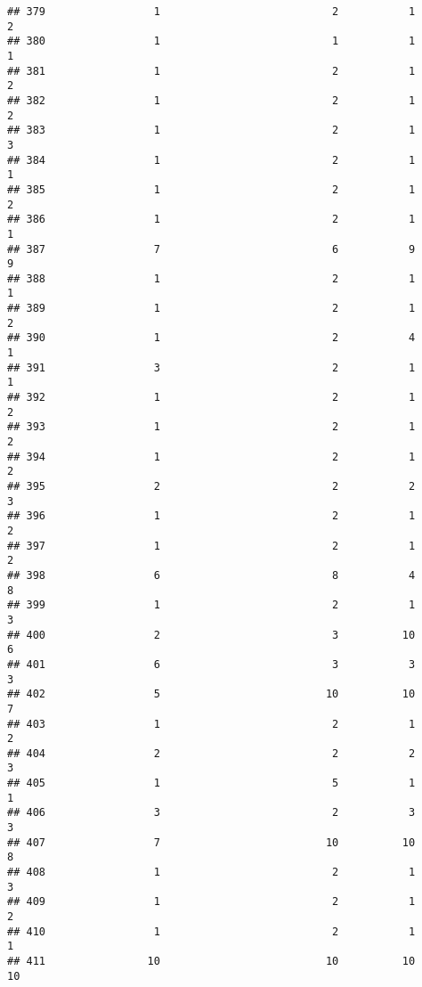 \documentclass[
]{article}
\begin{document}
\begin{verbatim}
## 379                 1                           2           1               2
## 380                 1                           1           1               1
## 381                 1                           2           1               2
## 382                 1                           2           1               2
## 383                 1                           2           1               3
## 384                 1                           2           1               1
## 385                 1                           2           1               2
## 386                 1                           2           1               1
## 387                 7                           6           9               9
## 388                 1                           2           1               1
## 389                 1                           2           1               2
## 390                 1                           2           4               1
## 391                 3                           2           1               1
## 392                 1                           2           1               2
## 393                 1                           2           1               2
## 394                 1                           2           1               2
## 395                 2                           2           2               3
## 396                 1                           2           1               2
## 397                 1                           2           1               2
## 398                 6                           8           4               8
## 399                 1                           2           1               3
## 400                 2                           3          10               6
## 401                 6                           3           3               3
## 402                 5                          10          10               7
## 403                 1                           2           1               2
## 404                 2                           2           2               3
## 405                 1                           5           1               1
## 406                 3                           2           3               3
## 407                 7                          10          10               8
## 408                 1                           2           1               3
## 409                 1                           2           1               2
## 410                 1                           2           1               1
## 411                10                          10          10              10

\end{verbatim}
\end{document}
